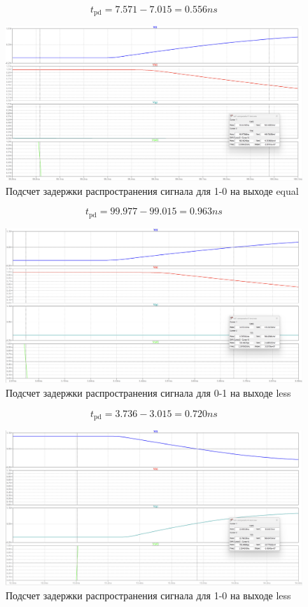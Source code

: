 \documentclass[12pt,onecolumn]{article}
\begin{document}
$$t_{\text{pd}} = 7.571 - 7.015 = 0.556 ns$$
\begin{figure}[H]
    \centering
    \includegraphics[width=\textwidth]{image/full-comparator-test-eq-10.png}
    \caption{Подсчет задержки распространения сигнала для 1-0 на выходе equal}
\end{figure}
$$t_{\text{pd}} = 99.977 - 99.015 = 0.963 ns$$
\begin{figure}[H]
    \centering
    \includegraphics[width=\textwidth]{image/full-comparator-test-less-01.png}
    \caption{Подсчет задержки распространения сигнала для 0-1 на выходе less}
\end{figure}
$$t_{\text{pd}} = 3.736 - 3.015 = 0.720 ns$$
\begin{figure}[H]
    \centering
    \includegraphics[width=\textwidth]{image/full-comparator-test-less-10.png}
    \caption{Подсчет задержки распространения сигнала для 1-0 на выходе less}
\end{figure}
\end{document}
